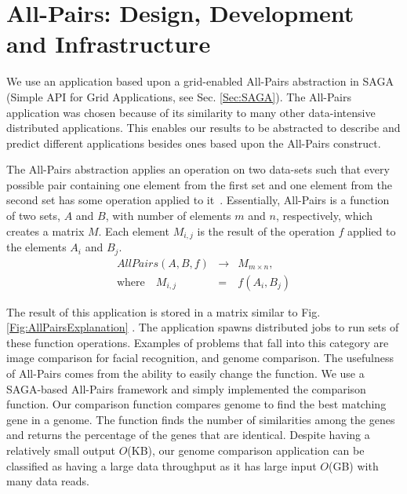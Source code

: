 \documentclass{rspublic}
\begin{document}
\vspace{-0.3cm}

\section{All-Pairs: Design, Development and Infrastructure} We use an
application based upon a grid-enabled All-Pairs abstraction in SAGA
(Simple API for Grid Applications, see Sec. \ref{Sec:SAGA}). The
All-Pairs application was chosen because of its similarity to many
other data-intensive distributed applications. This enables our
results to be abstracted to describe and predict different
applications besides ones based upon the All-Pairs construct. 

The All-Pairs abstraction applies an operation on two data-sets such
that every possible pair containing one element from the first set and
one element from the second set has some operation applied to
it~\citep{AllPairs}. Essentially, All-Pairs is a function of two sets,
$A$ and $B$, with number of elements $m$ and $n$, respectively, which
creates a matrix $M$. Each element $M_{i,j}$ is the result of the
operation $f$ applied to the elements $A_i$ and $B_j$.
\begin{eqnarray}
 AllPairs(A, B, f) & \rightarrow & M_{m \times n}, \\
\mbox{where} \quad M_{i,j} & = & f(A_{i},B_{j})
 \end{eqnarray}

The result of this application is stored in a matrix similar to Fig.
\ref{Fig:AllPairsExplanation} . The application spawns distributed jobs
to run sets of these function operations. Examples of problems that fall
into this category are image comparison for facial recognition, and
genome comparison.  The usefulness of All-Pairs comes from the ability
to easily change the function.  We use a SAGA-based All-Pairs framework
and simply implemented the comparison function.  Our comparison function
compares genome to find the best matching gene in a genome.  The
function finds the number of similarities among the genes and returns
the percentage of the genes that are identical. Despite having a
relatively small output $O$(KB), our genome comparison application can
be classified as having a large data throughput as it has large input
$O$(GB) with many data reads.
\end{document}
